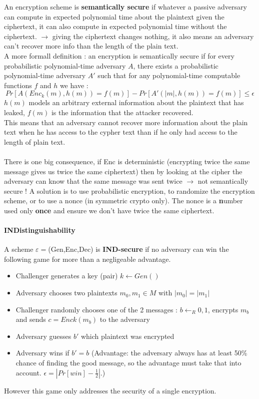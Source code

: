 \documentclass[11pt,a4paper]{report}
\begin{document}
An encryption scheme is \textbf{semantically secure} if whatever a passive adversary can compute in expected polynomial time about the plaintext given the ciphertext, it can also compute in expected polynomial time without the ciphertext. $\rightarrow$ giving the ciphertext changes nothing, it also means an adversary can't recover more info than the length of the plain text.\\
A more formall definition : an encryption is semantically secure if
for every probabilistic polynomial-time adversary $A$, there exists a probabilistic polynomial-time adversary $A'$ such that for any polynomial-time computable functions $f$ and $h$ we have :
$$Pr[A(Enc_k(m),h(m)) = f(m)] - Pr[A'(|m|, h(m))=f(m)] \leq \epsilon$$
$h(m)$ models an arbitrary external information about the plaintext that has leaked, $f(m)$ is the information that the attacker recovered.\\
This means that an adversary cannot recover more information about the plain text when he has access to the cypher text than if he only had access to the length of plain text.\\
\\
There is one big consequence, if Enc is deterministic (encrypting twice the same message gives us twice the same ciphertext) then by looking at the cipher the adversary can know that the same message was sent twice $\rightarrow$ not semantically secure ! A solution is to use probabilistic encryption, to randomize the encryption scheme, or to use a nonce (in symmetric crypto only). The nonce is a \textbf{n}umber used only \textbf{once} and ensure we don't have twice the same ciphertext.

\paragraph{INDistinguishability}

A scheme $\varepsilon =$(Gen,Enc,Dec) is \textbf{IND-secure} if no adversary can win the following game for more than a negligeable advantage.
\begin{itemize}
\item Challenger generates a key (pair) $k \leftarrow Gen()$
\item Adversary chooses two plaintexts $m_0, m_1 \in M$ with $|m_0| = |m_1|$
\item Challenger randomly chooses one of the 2 messages : $b \leftarrow_R {0, 1}$, encrypts $m_b$ and sends $c = Enck(m_b)$ to the adversary
\item Adversary guesses $b'$ which plaintext was encrypted
\item Adversary wins if $b' = b$ (Advantage: the adversary always has at least 50\% chance of finding the good message, so the advantage must take that into account. $\epsilon = |Pr [win] - \frac{1}{2} |$.)
\end{itemize}
However this game only addresses the security of a single encryption.
\end{document}
